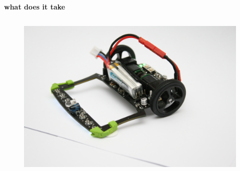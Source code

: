 \documentclass[xcolor=dvipsnames]{beamer}
\begin{document}
\begin{frame}{\bf what does it take}
\begin{columns}
\begin{column}{0.5\textwidth}
        \begin{figure}
            \includegraphics[scale=0.04]{../images/robot_06.jpg}
        \end{figure}
 
    \end{column}


\end{columns}

\end{frame}
\end{document}
